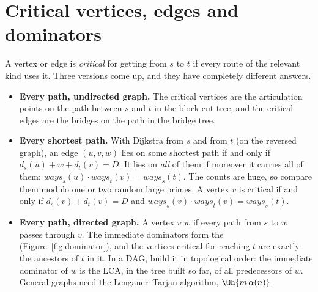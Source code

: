 \section[Critical vertices and dominators]{Critical vertices, edges and dominators \hfill \ioi}\label{sec:dominators}

A vertex or edge is \emph{critical} for getting from $s$ to $t$ if every route of the relevant kind uses it. Three versions come
up, and they have completely different answers.

\begin{itemize}
  \item \textbf{Every path, undirected graph.} The critical vertices are the articulation points on the path between $s$ and $t$
        in the block-cut tree, and the critical edges are the bridges on the path in the bridge tree.
  \item \textbf{Every shortest path.} With Dijkstra from $s$ and from $t$ (on the reversed graph), an edge $(u, v, w)$ lies on
        some shortest path if and only if $d_s(u) + w + d_t(v) = D$. It lies on \emph{all} of them if moreover it carries all of
        them: $\mathit{ways}_s(u) \cdot \mathit{ways}_t(v) = \mathit{ways}_s(t)$. The counts are huge, so compare them modulo one or
        two random large primes. A vertex $v$ is critical if and only if $d_s(v) + d_t(v) = D$ and $\mathit{ways}_s(v) \cdot
        \mathit{ways}_t(v) = \mathit{ways}_s(t)$.
  \item \textbf{Every path, directed graph.} A vertex $v$  $w$ if every path from $s$ to $w$ passes through $v$.
        The immediate dominators form the  (Figure~\ref{fig:dominator}), and the vertices critical for
        reaching $t$ are exactly the ancestors of $t$ in it. In a DAG, build it in topological order: the immediate dominator of
        $w$ is the LCA, in the tree built so far, of all predecessors of $w$. General graphs need the Lengauer--Tarjan algorithm,
        $\Oh{m\,\alpha(n)}$.
\end{itemize}

